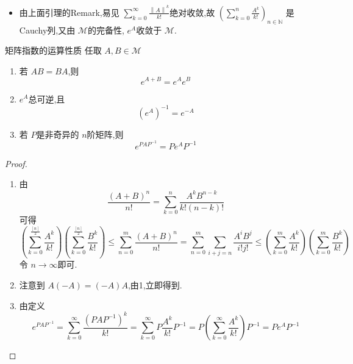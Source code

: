 \documentclass[lang=cn,12pt,color=green,fontset=none]{elegantbook}
\begin{document}
\begin{remark}
    \begin{itemize}
        \item 由上面引理的Remark,易见 $ \sum _{k=0}^{\infty} \frac{\left\| A \right\|^{k} }{k! }  $绝对收敛,故 $ \left( \sum _{k=0}^{n}\frac{A^{k} }{k! }  \right)_{n \in \mathbb{N} }  $ 是Cauchy列,又由 $ \mathcal{M} $的完备性, $ e^{A} $收敛于 $ \mathcal{M} $. 
    \end{itemize}
    
\end{remark}
\begin{proposition}{矩阵指数的运算性质}
    任取 $ A,B \in \mathcal{M} $ 
    \begin{enumerate}
        \item 若 $ AB =BA$,则 $$
        e^{A+ B}=e^{A}e^{B}
        $$ 
        \item  $ e^{A} $总可逆,且  $$
        \left( e^{A} \right)^{-1} =e^{-A} 
        $$ 
        \item 若 $ P $是非奇异的 $ n $阶矩阵,则 $$
        e^{PAP ^{-1} } = P e^{A}P ^{-1} 
        $$  
    \end{enumerate}
    
\end{proposition}

\begin{proof}
    \begin{enumerate}
        \item 由  $$
        \frac{\left( A+ B \right)^{n}  }{n! }= \sum _{k=0}^{n} \frac{A^{k}B^{n-k} }{k!\left( n-k \right)!  }  
        $$ 可得$$
       \left( \sum _{k=0} ^{\frac{[n] }{2 } } \frac{A^{k} }{k! } \right)  \left( \sum _{k=0} ^{\frac{[n] }{2 } } \frac{B^{k} }{k! } \right)  \le \sum _{ n = 0}^{m} \frac{\left( A+ B \right)^{n}  }{n! } = \sum _{n = 0}^{m} \sum _{i+ j = n}  \frac{ A^{i}B^{j} }{i!j! }  \le  \left( \sum _{k=0}^{m} \frac{A^{k} }{k! }  \right) \left( \sum _{k=0}^{m} \frac{B^{k} }{k! }  \right) 
        $$令 $ n\to  \infty $即可. 
        \item 注意到 $ A\left( -A \right)=\left( -A \right)A   $,由1,立即得到. 
        \item 由定义 $$
        e^{PAP ^{-1} } = \sum _{k=0}^{\infty} \frac{\left( PAP ^{-1}  \right)^{k}  }{k! }  = \sum _{k=0}^{\infty}  P \frac{A^{k} }{k! } P ^{-1} = P\left( \sum _{k=0}^{\infty} \frac{A^{k} }{k! } \right)P ^{-1} = Pe^{A}P ^{-1}    
        $$
    \end{enumerate}
    
\end{proof}
\end{document}
